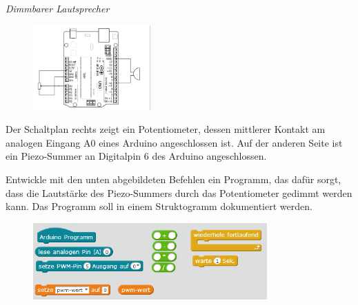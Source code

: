 \begin{aufgabe} \emph{Dimmbarer Lautsprecher}
	
	\begin{figure}
		\centering
		\vspace{-1\baselineskip}
		\includegraphics[width=0.4\textwidth]{./Zeichnungen/schaltplan-dimmbarer-lautsprecher.png}
	\end{figure}
	Der Schaltplan rechts zeigt ein Potentiometer, dessen mittlerer Kontakt am analogen Eingang A0 eines Arduino angeschlossen ist. Auf der anderen Seite ist ein Piezo-Summer an Digitalpin 6 des Arduino angeschlossen.
	
	Entwickle mit den unten abgebildeten Befehlen ein Programm, das dafür sorgt, dass die Lautstärke des Piezo-Summers durch das Potentiometer gedimmt werden kann. Das Programm soll in einem Struktogramm dokumentiert werden.
	
	\begin{figure}[H]
		\centering
		\includegraphics[width=0.8\textwidth]{./pics/befehle-fuer-dimmbaren-lautsprecher.png}
	\end{figure}
\end{aufgabe}


